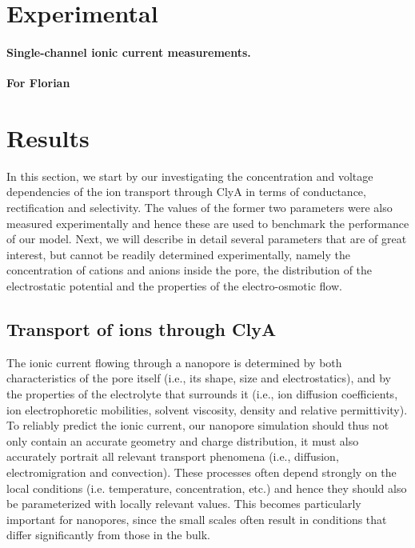 \documentclass[journal=ancac3, manuscript=article, etalmode=truncate,maxauthors=0]{achemso}
\begin{document}
\section{Experimental}\label{sect:experiment}
\paragraph{Single-channel ionic current measurements.}
\textbf{For Florian}

\newpage
\section{Results}\label{sect:results}
In this section, we start by our investigating the concentration and voltage dependencies of the ion 
transport through ClyA in terms of conductance, rectification and selectivity. The values of the former two 
parameters were also measured experimentally and hence these are used to benchmark the performance of our 
model. Next, we will describe in detail several parameters that are of great interest, but cannot be readily 
determined experimentally, namely the concentration of cations and anions inside the pore, the distribution 
of the electrostatic potential and the properties of the electro-osmotic flow. 

\subsection{Transport of ions through ClyA}
The ionic current flowing through a nanopore is determined by both characteristics of the pore itself (i.e., 
its shape, size and electrostatics), and by the properties of the electrolyte that surrounds it (i.e., 
ion diffusion coefficients, ion electrophoretic mobilities, solvent viscosity, density and relative 
permittivity). To reliably predict the ionic current, our nanopore simulation should thus not only contain an 
accurate geometry and charge distribution, it must also accurately portrait all relevant transport phenomena 
(i.e., diffusion, electromigration and convection). These processes often depend strongly on the local 
conditions (i.e. temperature, concentration, etc.) and hence they should also be parameterized with locally 
relevant values. This becomes particularly important for nanopores, since the small scales often result in 
conditions that differ significantly from those in the bulk.
\end{document}
